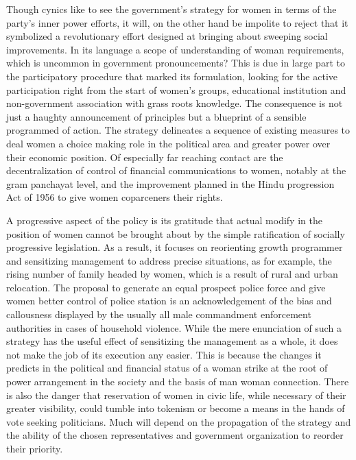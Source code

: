 



Though cynics like to see the government’s strategy for women in terms of the party’s inner power efforts, it will, on the other hand be impolite to reject that it symbolized a revolutionary effort designed at bringing about sweeping social improvements. In its language a scope of understanding of woman requirements, which is uncommon in government pronouncements? This is due in large part to the participatory procedure that marked its formulation, looking for the active participation right from the start of women’s groups, educational institution and non-government association with grass roots knowledge. The consequence is not just a haughty announcement of principles but a blueprint of a sensible programmed of action. The strategy delineates a sequence of existing measures to deal women a choice making role in the political area and greater power over their economic position. Of especially far reaching contact are the decentralization of control of financial communications to women, notably at the gram panchayat level, and the improvement planned in the Hindu progression Act of 1956 to give women coparceners their rights.

A progressive aspect of the policy is its gratitude that actual modify in the position of women cannot be brought about by the simple ratification of socially progressive legislation. As a result, it focuses on reorienting growth programmer and sensitizing management to address precise situations, as for example, the rising number of family headed by women, which is a result of rural and urban relocation. The proposal to generate an equal prospect police force and give women better control of police station is an acknowledgement of the bias and callousness displayed by the usually all male commandment enforcement authorities in cases of household violence. While the mere enunciation of such a strategy has the useful effect of sensitizing the management as a whole, it does not make the job of its execution any easier. This is because the changes it predicts in the political and financial status of a woman strike at the root of power arrangement in the society and the basis of man woman connection. There is also the danger that reservation of women in civic life, while necessary of their greater visibility, could tumble into tokenism or become a means in the hands of vote seeking politicians. Much will depend on the propagation of the strategy and the ability of the chosen representatives and government organization to reorder their priority.

